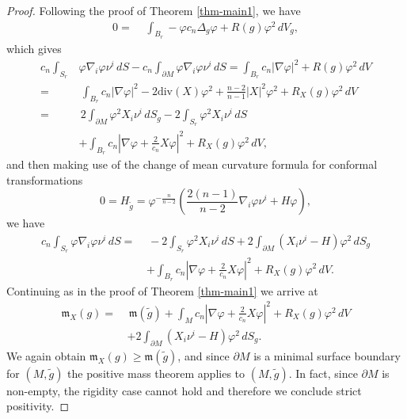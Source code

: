 \documentclass[a4paper,11pt,reqno]{amsart}
\theoremstyle{plain}
\theoremstyle{definition}
\theoremstyle{remark}
\newcommand{\m}{\mathfrak{m}}
\numberwithin{equation}{section}
\begin{document}
\begin{proof}
	Following the proof of Theorem \ref{thm-main1}, we have
	\begin{align*}
		0=\,&\,\int_{B_r}-\varphi c_n\Delta_g\varphi+R(g)\varphi^2\,dV_g,
	\end{align*}
	which gives
		\begin{align*}
		c_n\int_{S_r}&\varphi\nabla_i\varphi \nu^i\,dS-c_n\int_{\partial M}\varphi\nabla_i\varphi \nu^i\,dS=\int_{B_r}c_n|\nabla\varphi|^2+R(g)\varphi^2\,dV\nonumber\\
		=\,&\, \int_{B_r}c_n|\nabla\varphi|^2-2\mathrm{div}(X)\varphi^2+ \frac{n-2}{n-1}|X|^2\varphi^2+R_X(g)\varphi^2\,dV\\
		=\,&\, 2\int_{\partial M}\varphi^2 X_i\nu^i\,dS_g-2\int_{S_r}\varphi^2 X_i\nu^i\,dS\\
		&+\int_{B_r}c_n\left| \nabla\varphi+\frac{2}{c_n}X\varphi\right|^2+R_X(g)\varphi^2\,dV,
	\end{align*}
	and then making use of the change of mean curvature formula for conformal transformations 
	\begin{equation}\label{eq-confH}
			0=H_{\widetilde g}=\varphi^{-\frac{n}{n-2}}\left( \frac{2(n-1)}{n-2}\nabla_i\varphi\nu^i+H\varphi \right),
	\end{equation}
	we have
	\begin{align*}
		c_n\int_{S_r}\varphi\nabla_i\varphi \nu^i\,dS=\,&\,-2\int_{S_r}\varphi^2 X_i\nu^i\,dS+2\int_{\partial M} (X_i\nu^i-H)\varphi^2\,dS_g\\
		& +\int_{B_r}c_n\left| \nabla\varphi+\frac{2}{c_n}X\varphi\right|^2+R_X(g)\varphi^2\,dV.
	\end{align*}
 	Continuing as in the proof of Theorem \ref{thm-main1} we arrive at
	\begin{align*}
		\m_X(g)=\,&\,\m(\widetilde g)+\int_{M} c_n\left| \nabla\varphi+\frac{2}{c_n}X\varphi\right|^2+R_X(g)\varphi^2\,dV\\
		&+2\int_{\partial M}(X_i\nu^i-H)\varphi^2\,dS_g.
	\end{align*}
 We again obtain $\m_X(g)\geq \m(\widetilde g)$, and since $\partial M$ is a minimal surface boundary for $(M,\widetilde g)$ the positive mass theorem applies to $(M,\widetilde g)$. In fact, since $\partial M$ is non-empty, the rigidity case cannot hold and therefore we conclude strict positivity.
   
\end{proof}



%

\end{document}
